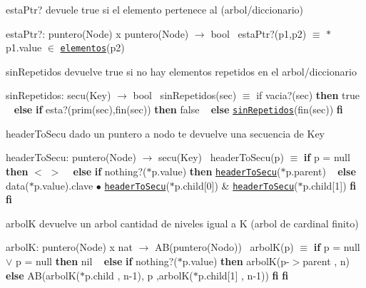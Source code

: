\begin{DoxyParagraph}{esta\+Ptr?}
devuele true si el elemento pertenece al (arbol/diccionario)

esta\+Ptr?\+: puntero(\+Node) x puntero(\+Node) $\to$ bool~\newline
 esta\+Ptr?(p1,p2) $\equiv$ $\ast$p1.value $\in$ \href{axiomas.html#elementos}{\tt elementos}(p2) 
\end{DoxyParagraph}


\begin{DoxyParagraph}{sin\+Repetidos}
devuelve true si no hay elementos repetidos en el arbol/diccionario

sin\+Repetidos\+: secu(\+Key) $\to$ bool~\newline
 sin\+Repetidos(sec) $\equiv$ if vacia?(sec) {\bfseries then} true ~\newline
 {\bfseries else} {\bfseries if} esta?(prim(sec),fin(sec)) {\bfseries then} false ~\newline
 {\bfseries else} \href{axiomas.html#sinRepetidos}{\tt sin\+Repetidos}(fin(sec)) {\bfseries fi} 
\end{DoxyParagraph}


\begin{DoxyParagraph}{header\+To\+Secu}
dado un puntero a nodo te devuelve una secuencia de Key

header\+To\+Secu\+: puntero(\+Node) $\to$ secu(\+Key)~\newline
 header\+To\+Secu(p) $\equiv$ {\bfseries if} p = null {\bfseries then} $<$ $>$ ~\newline
 {\bfseries else} {\bfseries if} nothing?($\ast$p.value) {\bfseries then} \href{axiomas.html#headerToSecu}{\tt header\+To\+Secu}($\ast$p.parent) ~\newline
 {\bfseries else} data($\ast$p.value).clave $\bullet$ \href{axiomas.html#headerToSecu}{\tt header\+To\+Secu}($\ast$p.child\mbox{[}0\mbox{]}) \& \href{axiomas.html#headerToSecu}{\tt header\+To\+Secu}($\ast$p.child\mbox{[}1\mbox{]}) {\bfseries fi} {\bfseries fi} 
\end{DoxyParagraph}


\begin{DoxyParagraph}{arbolK}
devuelve un arbol cantidad de niveles igual a K (arbol de cardinal finito)

arbolK\+: puntero(\+Node) x nat $\to$ A\+B(puntero(\+Nodo))~\newline
 arbol\+K(p) $\equiv$ {\bfseries if} p = null $\lor$ p = null {\bfseries then} nil ~\newline
 {\bfseries else} {\bfseries if} nothing?($\ast$p.value) {\bfseries then} arbolK(p-\/$>$parent , n) ~\newline
 {\bfseries else} AB(arbolK($\ast$p.child , n-\/1), p ,arbolK($\ast$p.child\mbox{[}1\mbox{]} , n-\/1)) {\bfseries fi} {\bfseries fi} 
\end{DoxyParagraph}



